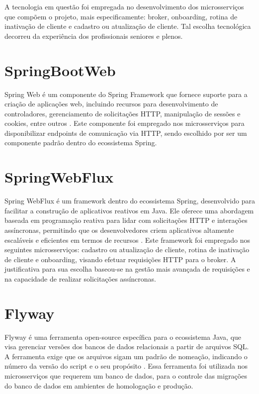 A tecnologia em questão foi empregada no desenvolvimento dos microsserviços que compõem o projeto, mais especificamente: broker, onboarding, rotina de inativação de cliente e cadastro ou atualização de cliente. Tal escolha tecnológica decorreu da experiência dos profissionais seniores e plenos.

\section{SpringBootWeb}

Spring Web é um componente do Spring Framework que fornece suporte para a criação de aplicações web, incluindo recursos para desenvolvimento de controladores, gerenciamento de solicitações HTTP, manipulação de sessões e cookies, entre outros \cite{spring:web:explicacao}. Este componente foi empregado nos microsserviços para disponibilizar endpoints de comunicação via HTTP, sendo escolhido por ser um componente padrão dentro do ecossistema Spring.

\section{SpringWebFlux}

Spring WebFlux é um framework dentro do ecossistema Spring, desenvolvido para facilitar a construção de aplicativos reativos em Java. Ele oferece uma abordagem baseada em programação reativa para lidar com solicitações HTTP e interações assíncronas, permitindo que os desenvolvedores criem aplicativos altamente escaláveis e eficientes em termos de recursos \cite{spring:web:flux:explicacao}. 
Este framework foi empregado nos seguintes microsserviços: cadastro ou atualização de cliente, rotina de inativação de cliente e onboarding, visando efetuar requisições HTTP para o broker. A justificativa para sua escolha baseou-se na gestão mais avançada de requisições e na capacidade de realizar solicitações assíncronas.

\section{Flyway}

Flyway é uma ferramenta open-source específica para o ecossistema Java, que visa gerenciar versões dos bancos de dados relacionais a partir de arquivos SQL. A ferramenta exige que os arquivos sigam um padrão de nomeação, indicando o número da versão do script e o seu propósito \cite{flyway:explicacao}. 
Essa ferramenta foi utilizada nos microsserviços que requerem um banco de dados, para o controle das migrações do banco de dados em ambientes de homologação e produção.


